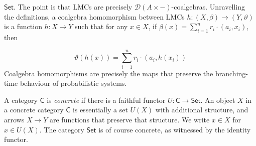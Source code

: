 \hypertarget{html:S2.SS0.SSS0.P0.SPx3.p2.m7}{}\({\mathsf{Set}}\). The point is that LMCs are precisely %
\hypertarget{html:S2.SS0.SSS0.P0.SPx3.p2.m8}{}\({{\mathcal{D}}(A\times-)}\)-coalgebras. Unravelling the definitions, a coalgebra homomorphism between LMCs %
\hypertarget{html:S2.SS0.SSS0.P0.SPx3.p2.m9}{}\({h\colon(X,\beta)\to(Y,\vartheta)}\) is a function %
\hypertarget{html:S2.SS0.SSS0.P0.SPx3.p2.m10}{}\({h\colon X\to Y}\) such that for any %
\hypertarget{html:S2.SS0.SSS0.P0.SPx3.p2.m11}{}\({x\in X}\), if %
\hypertarget{html:S2.SS0.SSS0.P0.SPx3.p2.m12}{}\({\beta(x)=\sum_{i=1}^{n}r_{i}\cdot(a_{i},x_{i})}\), then
\par\medskip
\hypertarget{html:S2.Ex4}{}   %
\hypertarget{html:S2.Ex4.m1}{}\[\vartheta(h(x))=\sum_{i=1}^{n}r_{i}\cdot(a_{i},h(x_{i}))\]    Coalgebra homomorphisms are precisely the maps that preserve the branching-time behaviour of probabilistic systems.
\par\medskip
\hypertarget{html:S2.SS0.SSS0.P0.SPx3.p3}{} A category %
\hypertarget{html:S2.SS0.SSS0.P0.SPx3.p3.m1}{}\({\mathsf{C}}\) is \emph{concrete} if there is a faithful functor %
\hypertarget{html:S2.SS0.SSS0.P0.SPx3.p3.m2}{}\({U\colon\mathsf{C}\to\mathsf{Set}}\). An object %
\hypertarget{html:S2.SS0.SSS0.P0.SPx3.p3.m3}{}\({X}\) in a concrete category %
\hypertarget{html:S2.SS0.SSS0.P0.SPx3.p3.m4}{}\({\mathsf{C}}\) is essentially a set %
\hypertarget{html:S2.SS0.SSS0.P0.SPx3.p3.m5}{}\({U(X)}\) with additional structure, and arrows %
\hypertarget{html:S2.SS0.SSS0.P0.SPx3.p3.m6}{}\({X\to Y}\) are functions that preserve that structure. We write %
\hypertarget{html:S2.SS0.SSS0.P0.SPx3.p3.m7}{}\({x\in X}\) for %
\hypertarget{html:S2.SS0.SSS0.P0.SPx3.p3.m8}{}\({x\in U(X)}\). The category %
\hypertarget{html:S2.SS0.SSS0.P0.SPx3.p3.m9}{}\({\mathsf{Set}}\) is of course concrete, as witnessed by the identity functor.
\par\medskip
